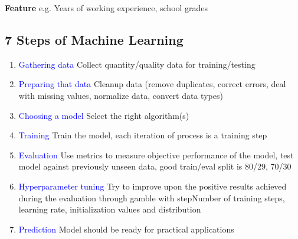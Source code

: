 \textbf{Feature} e.g. Years of working experience, school grades

\subsection{7 Steps of Machine Learning}
\begin{enumerate}
    \item \textcolor{blue}{Gathering data} Collect quantity/quality data for training/testing
    \item \textcolor{blue}{Preparing that data} Cleanup data (remove duplicates, correct errors, deal with missing values, normalize data, convert data types)
    \item \textcolor{blue}{Choosing a model} Select the right algorithm(s)
    \item \textcolor{blue}{Training} Train the model, each iteration of process is a training step
    \item \textcolor{blue}{Evaluation} Use metrics to measure objective performance of the model, test model against previously unseen data, good train/eval split is 80/29, 70/30
    \item \textcolor{blue}{Hyperparameter tuning} Try to improve upon the positive results achieved during the evaluation through gamble with stepNumber of training steps, learning rate, initialization values and distribution
    \item \textcolor{blue}{Prediction} Model should be ready for practical applications
\end{enumerate}
